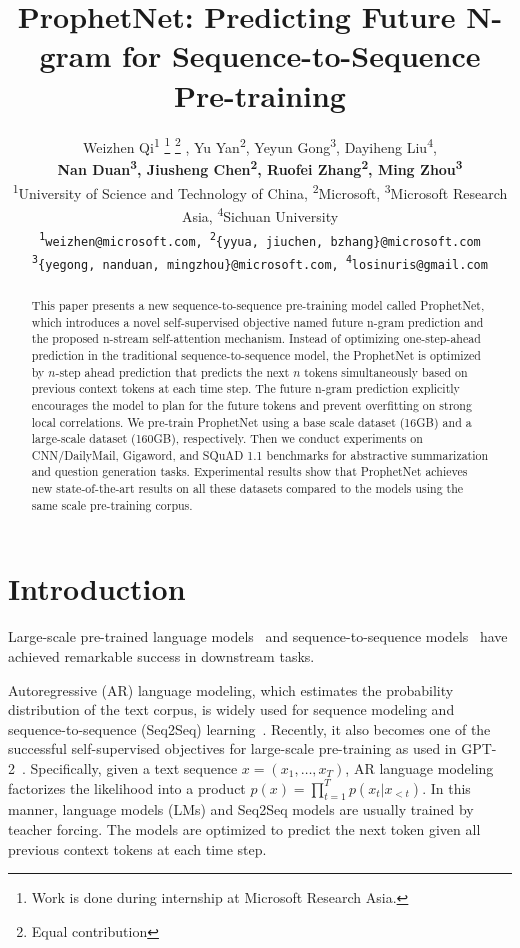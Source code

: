 \documentclass[11pt,a4paper]{article}
\title{ProphetNet: Predicting Future N-gram for Sequence-to-Sequence Pre-training}
\author{Weizhen Qi\textsuperscript{1} \thanks{ \hspace{1mm}Work is done during internship at Microsoft Research Asia.}     \thanks{ \hspace{1mm} Equal contribution} , Yu Yan\textsuperscript{2}\footnotemark[2], Yeyun Gong\textsuperscript{3}\footnotemark[2], Dayiheng Liu\textsuperscript{4}\footnotemark[2], \\
\textbf{Nan Duan\textsuperscript{3}, Jiusheng Chen\textsuperscript{2},  Ruofei Zhang\textsuperscript{2}, Ming Zhou\textsuperscript{3}}  \\
  \textsuperscript{1}University of Science and Technology of China, \textsuperscript{2}Microsoft, \textsuperscript{3}Microsoft Research Asia,
  \textsuperscript{4}Sichuan University  \\
  \texttt{\textsuperscript{1}weizhen@microsoft.com, \textsuperscript{2}\{yyua, jiuchen, bzhang\}@microsoft.com} \\  
  \texttt{\textsuperscript{3}\{yegong, nanduan, mingzhou\}@microsoft.com, \textsuperscript{4}losinuris@gmail.com}
  
  }
\date{}
\begin{document}
\maketitle
\begin{abstract}
This paper presents a new sequence-to-sequence pre-training model called ProphetNet, which introduces a novel self-supervised objective named future n-gram prediction and the proposed n-stream self-attention mechanism. Instead of optimizing one-step-ahead prediction in the traditional sequence-to-sequence model, the ProphetNet is optimized by $n$-step ahead prediction that predicts the next $n$ tokens simultaneously based on previous context tokens at each time step. The future n-gram prediction explicitly encourages the model to plan for the future tokens and prevent overfitting on strong local correlations.  We pre-train ProphetNet using a base scale dataset (16GB) and a large-scale dataset (160GB), respectively. Then we conduct experiments on CNN/DailyMail, Gigaword, and SQuAD 1.1 benchmarks for abstractive summarization and question generation tasks. Experimental results show that ProphetNet achieves new state-of-the-art results on all these datasets compared to the models using the same scale pre-training corpus.
\end{abstract}

\section{Introduction}
Large-scale pre-trained language models~\cite{devlin2018bert,radford2019language,yang2019xlnet} and sequence-to-sequence models~\cite{lewis2019bart, song2019mass, raffel2019exploring} have achieved remarkable success in downstream tasks. 

Autoregressive (AR) language modeling, which estimates the probability distribution of the text corpus, is widely used for sequence modeling and sequence-to-sequence (Seq2Seq) learning~\cite{sutskever2014sequence}. 
Recently, it also becomes one of the successful self-supervised objectives for large-scale pre-training as used in GPT-2~\cite{radford2019language}.
Specifically, given a text sequence $x = (x_1, \dots, x_T)$, AR language modeling factorizes the likelihood into a product $p(x) = \prod^{T}_{t=1} p(x_t | x_{<t})$.
In this manner, language models (LMs) and Seq2Seq models are usually trained by teacher forcing. The models are optimized to predict the next token given all previous context tokens at each time step. 
\end{document}
